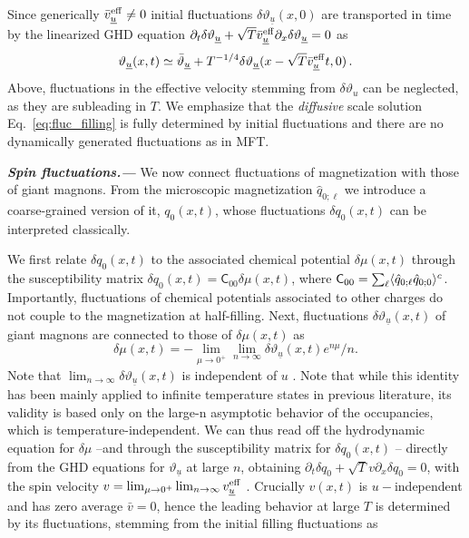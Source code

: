 \documentclass[
twocolumn,
amsfonts,
showpacs,
superscriptaddress,
amsmath,
amssymb,
aps,
longbibliography,
prl,
noeprint
]{revtex4-2}
\newcommand{\ch}[1]{{\color{black}  #1}}
\newcommand{\be}{\begin{equation}}
\newcommand{\ee}{\end{equation}}
\newcommand{\uu}{\underline{u}}
\newcommand{\Tx}{{x}}
\newcommand{\Tt}{{t}}
\newcommand{\veff}{v^\eff}
\newcommand{\bveff}{\bar{v}^\eff}
\newcommand{\para}[1]{ \noindent\emph{\textbf{#1---}}}
\newcounter{ls}
\newcommand{\1}{{\bf 1}}
\newcommand{\eff}{{\rm eff}}
\begin{document}
Since generically $\bveff_{\uu}\neq0$ initial fluctuations $\delta \vartheta_{\uu}(x,0)$ are transported in time by the linearized GHD equation $\partial_{\Tt}\delta\vartheta_{\uu}+\sqrt{T}\bveff_{\uu}\partial_{\Tx}\delta\vartheta_{\uu}=0$ as
\be\label{eq:fluc_filling}
    \vartheta_{\uu}(x,t)\simeq  \bar{\vartheta}_{\uu}+T^{-1/4}\delta\vartheta_{\uu}(\Tx-\sqrt{T}\bveff_{\uu}\Tt,0)\, .
\ee
\ch{Above, fluctuations in the effective velocity stemming from $\delta \vartheta_u$ can be neglected, as they are subleading in $T$.}
We emphasize that the \emph{diffusive} scale solution Eq.~\eqref{eq:fluc_filling} is fully determined by initial fluctuations and there are no dynamically generated fluctuations as in MFT.




\para{Spin fluctuations.}
 We now connect fluctuations of magnetization with those of giant magnons.
From the microscopic magnetization $\hat{q}_{0;\ell}$ we introduce a coarse-grained version of it, $q_0(x,t)$, whose fluctuations $\delta q_0(x,t)$ can be interpreted classically.

We first relate $\delta q_0(\Tx,\Tt)$ to the associated chemical potential $\delta \mu(\Tx,\Tt)$ through the susceptibility matrix $\delta q_0(\Tx,\Tt)=\mathsf{C}_{00}\delta \mu(\Tx,\Tt)$, where $\mathsf{C}_{00}=\sum_\ell\langle \ch{\hat q_{0;\ell}\hat q_{0;0}}\rangle^{\ch{c}}$. Importantly, fluctuations of chemical potentials associated to other charges do not couple to the magnetization at half-filling. Next, fluctuations $\delta \vartheta_{\underline{u}}(x,t)$ of giant magnons are connected to those of $\delta \mu(\Tx,\Tt)$ as \cite{DeNardis2019}
\be\label{eq:magic}
    \delta \mu(x,t)= -\lim_{\mu\to 0^+} \lim_{n\to \infty}\delta\vartheta_{\uu}(\Tx,\Tt) e^{n\mu}/n.
\ee
Note that $ \lim_{n\to\infty}\delta\vartheta_{\uu}(x,t)$ is independent of $u$ \cite{Piroli2017}. \ch{Note that while this identity has been mainly applied to infinite temperature states in previous literature, its validity is based only on the large-n asymptotic behavior of the occupancies, which is temperature-independent.}
We can thus read off the hydrodynamic equation for $\delta \mu$ --and through the susceptibility matrix for $\delta q_0(x,t)$ -- directly from the GHD equations for $\vartheta_{\uu}$ at large $n$, obtaining
$\partial_\Tt \delta q_0+\sqrt{T}v\partial_\Tx \delta q_0=0$, with the spin velocity
$v= \lim_{\mu \to 0^+}\lim_{n\to \infty}\veff_{\uu}$
\cite{Piroli2017}. Crucially $v(x,t)$ is $u-$independent and has zero average $\bar{v}=0$, hence the leading behavior at large $T$ is determined by its fluctuations, stemming from the initial filling fluctuations as
\end{document}
